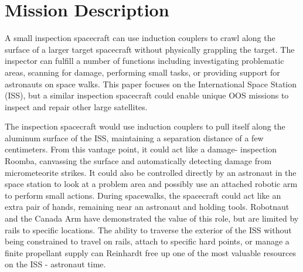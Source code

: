 \section{Mission Description}

A small inspection spacecraft can use induction couplers to crawl along the surface of a larger target spacecraft without physically grappling the target. The inspector can fulfill a number of functions including investigating problematic areas, scanning for damage, performing small tasks, or providing support for astronauts on space walks. This paper focuses on the International Space Station (ISS), but a similar inspection spacecraft could enable unique OOS missions to inspect and repair other large satellites.

The inspection spacecraft would use induction couplers to pull itself along the aluminum surface of the ISS, maintaining a separation distance of a few centimeters. From this vantage point, it could act like a damage- inspection Roomba, canvassing the surface and automatically detecting damage from micrometeorite strikes. It could also be controlled directly by an astronaut in the space station to look at a problem area and possibly use an attached robotic arm to perform small actions. During spacewalks, the spacecraft could act like an extra pair of hands, remaining near an astronaut and holding tools. Robotnaut and the Canada Arm have demonstrated the value of this role, but are limited by rails to specific locations.
The ability to traverse the exterior of the ISS without being constrained to travel on rails, attach to specific hard points, or manage a finite propellant supply can
Reinhardt
free up one of the most valuable resources on the ISS - astronaut time.

